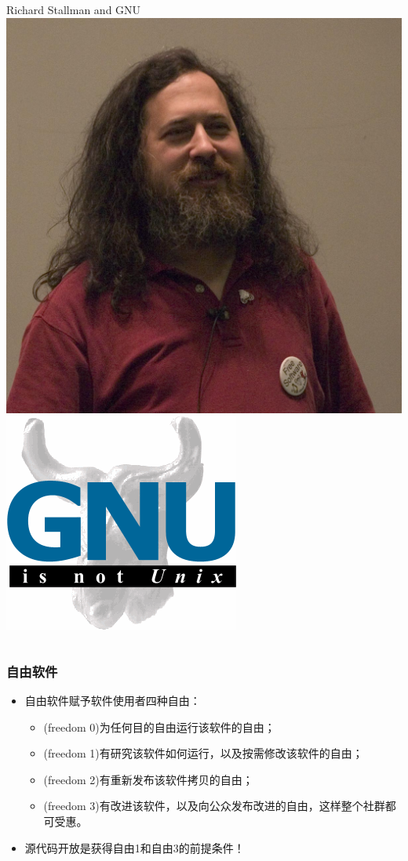 \documentclass[xcolor=svgnames,bigger,presentation]{beamer}
\begin{document}
\begin{frame}
\begin{columns}
\begin{column}{0.5\textwidth}
\begin{exampleblock}{Richard Stallman and GNU}
\includegraphics[width=.5\textwidth]{img/stallman.jpg}
\includegraphics[width=.5\textwidth]{img/gnu.jpg}
\end{exampleblock}
\end{column}
\end{columns}
\end{frame}
\begin{frame}
\frametitle{自由软件}
\label{sec-2-2-4}
\begin{itemize}

\item 自由软件赋予软件使用者四种自由：
\label{sec-2-2-4-1}%
\begin{itemize}

\item (freedom 0)为任何目的自由运行该软件的自由；
\label{sec-2-2-4-1-1}%

\item (freedom 1)有研究该软件如何运行，以及按需修改该软件的自由；
\label{sec-2-2-4-1-2}%

\item (freedom 2)有重新发布该软件拷贝的自由；
\label{sec-2-2-4-1-3}%

\item (freedom 3)有改进该软件，以及向公众发布改进的自由，这样整个社群都可受惠。
\label{sec-2-2-4-1-4}%
\end{itemize} %

\item 源代码开放是获得自由1和自由3的前提条件！
\label{sec-2-2-4-2}%
\end{itemize} %
\end{frame}
\end{document}
